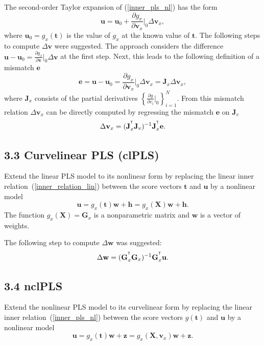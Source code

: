 \documentclass[12pt,twoside]{article}
\newcommand{\bz}{\mathbf{z}}
\newcommand{\bw}{\mathbf{w}}
\newcommand{\bX}{\mathbf{X}}
\newcommand{\bu}{\mathbf{u}}
\newcommand{\bt}{\mathbf{t}}
\newcommand{\bh}{\mathbf{h}}
\newcommand{\bv}{\mathbf{v}}
\newcommand{\be}{\mathbf{e}}
\newcommand{\bG}{\mathbf{G}}
\newcommand{\bJ}{\mathbf{J}}
\begin{document}
	The second-order Taylor expansion of (\ref{inner_pls_nl}) has the form
	\begin{equation*}
		\bu = \bu_{0} + \frac{\partial g_x}{\partial \bv_x} \Big|_{0} \Delta \bv_x,
	\end{equation*}
	where $\bu_{0} = g_x(\bt)$ is the value of $g_x$ at the known value of $\bt$.
	The following steps to compute $\Delta \bv$ were suggested. The approach considers the difference $\bu - \bu_{0} = \frac {\partial g_x}{\partial \bv} \Big|_{0} \Delta \bv$ at the first step. Next, this leads to the following definition of a mismatch $\be$
	\begin{equation*}
		\be = \bu - \bu_{0} = \frac {\partial g_x}{\partial \bv_x} \Big|_{0} \Delta \bv_x = \bJ_{x} \Delta \bv_x,
	\end{equation*}
	where $\bJ_{x}$ consists of the partial derivatives $\left\{\frac {\partial g}{\partial v_i}\Big|_{0} \right\}_{i=1}^N$. From this mismatch relation $\Delta \bv_x$ can be directly computed by regressing the mismatch $\be$ on $\bJ_v$ 
	\begin{equation}
	\label{delta_v}
		\Delta \bv_x  = (\bJ^{\T}_x \bJ_v)^{-1} \bJ_x^{\T} \be.
	\end{equation}


\subsection{3.3 Curvelinear PLS (clPLS)}
	Extend the linear PLS model to its nonlinear form by replacing the linear inner relation~(\ref{inner_relation_lin}) between the score vectors $\bt$ and $\bu$ by a nonlinear model 
	\begin{equation}
	\label{inner_pls_nonlin}
		\bu = g_x(\bt) \bw  + \bh = g_x(\bX) \bw + \bh.
	\end{equation}
	The function $g_x(\bX) = \bG_x$ is a nonparametric matrix and $\bw$ is a vector of weights.

	The following step to compute $\Delta \bw$ was suggested:
	\begin{equation}
	\label{delta_w}
		\Delta \bw = (\bG_x^{\T} \bG_x)^{-1} \bG_x^{\T} \bu.
	\end{equation}


\subsection{3.4 nclPLS}
	Extend the nonlinear PLS model to its curvelinear form by replacing the linear inner relation~(\ref{inner_pls_nl}) between the score vectors $g(\bt)$ and $\bu$ by a nonlinear model 
	\begin{equation}
	\label{inner_pls_ncl}
		\bu = g_x(\bt) \bw  + \bz = g_x(\bX, \bv_x) \bw + \bz.
	\end{equation}
	
\end{document}

